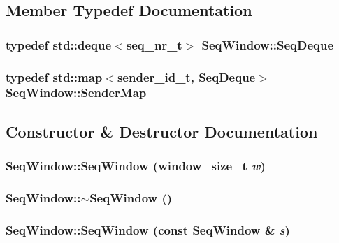 \subsection{Member Typedef Documentation}
\subsubsection{\setlength{\rightskip}{0pt plus 5cm}typedef std::deque$<${\bf seq\_\-nr\_\-t}$>$ {\bf Seq\-Window::Seq\-Deque}}\label{classSeqWindow_cf2d07003c8ca868146cffb4dd1d5ca7}


\subsubsection{\setlength{\rightskip}{0pt plus 5cm}typedef std::map$<${\bf sender\_\-id\_\-t}, {\bf Seq\-Deque}$>$ {\bf Seq\-Window::Sender\-Map}}\label{classSeqWindow_127195f139c8d5d07ed93799c2d6821a}




\subsection{Constructor \& Destructor Documentation}
\subsubsection{\setlength{\rightskip}{0pt plus 5cm}Seq\-Window::Seq\-Window ({\bf window\_\-size\_\-t} {\em w})}\label{classSeqWindow_8d513ab9ef2984ea93dad7e4026185c8}


\subsubsection{\setlength{\rightskip}{0pt plus 5cm}Seq\-Window::$\sim$Seq\-Window ()}\label{classSeqWindow_d125bcc4751a746427f04dda7fd65a10}


\subsubsection{\setlength{\rightskip}{0pt plus 5cm}Seq\-Window::Seq\-Window (const {\bf Seq\-Window} \& {\em s})\hspace{0.3cm}{\tt  [private]}}\label{classSeqWindow_7a30b232f312d843b8d188cae01fef28}




